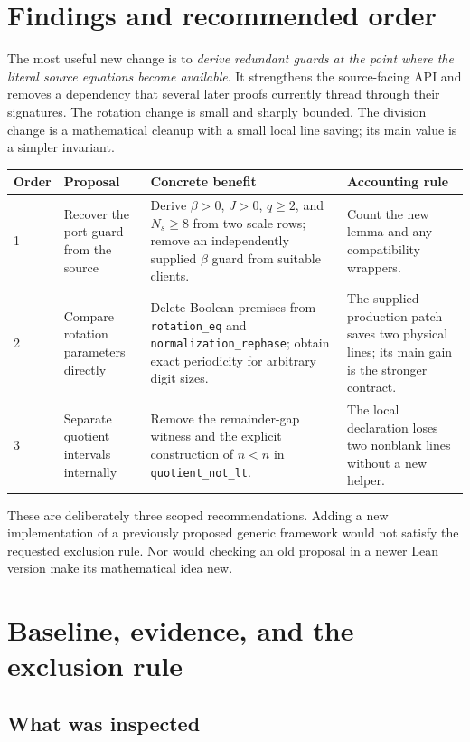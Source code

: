 \documentclass[11pt,letterpaper]{article}
\newcommand{\code}[1]{{\small\urlstyle{tt}\nolinkurl{#1}}}
\begin{document}
\section{Findings and recommended order}

The most useful new change is to \emph{derive redundant guards at the point where the literal source equations become available}. It strengthens the source-facing API and removes a dependency that several later proofs currently thread through their signatures. The rotation change is small and sharply bounded. The division change is a mathematical cleanup with a small local line saving; its main value is a simpler invariant.

\begin{tabularx}{\textwidth}{@{}p{}p{}Xp{}@{}}
\toprule
Order & Proposal & Concrete benefit & Accounting rule\\
\midrule
1 & Recover the port guard from the source & Derive $\beta>0$, $J>0$, $q\ge2$, and $N_s\ge8$ from two scale rows; remove an independently supplied $\beta$ guard from suitable clients. & Count the new lemma and any compatibility wrappers.\\[4pt]
2 & Compare rotation parameters directly & Delete Boolean premises from \code{rotation_eq} and \code{normalization_rephase}; obtain exact periodicity for arbitrary digit sizes. & The supplied production patch saves two physical lines; its main gain is the stronger contract.\\[4pt]
3 & Separate quotient intervals internally & Remove the remainder-gap witness and the explicit construction of $n<n$ in \code{quotient_not_lt}. & The local declaration loses two nonblank lines without a new helper.\\
\bottomrule
\end{tabularx}

These are deliberately three scoped recommendations. Adding a new implementation of a previously proposed generic framework would not satisfy the requested exclusion rule. Nor would checking an old proposal in a newer Lean version make its mathematical idea new.

\section{Baseline, evidence, and the exclusion rule}
\label{sec:baseline}

\subsection{What was inspected}
\end{document}
